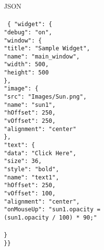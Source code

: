 \begin{minipage}{0.5\textwidth}
{\Large JSON}\\\\
\texttt{\small
\{ "widget": \{\\
\hspace*{2mm}"debug": "on",\\
\hspace*{2mm}"window": \{\\
\hspace*{4mm}"title": "Sample Widget",\\
\hspace*{4mm}"name": "main\_window",\\
\hspace*{4mm}"width": 500,\\
\hspace*{4mm}"height": 500\\
\hspace*{2mm}\},\\
\hspace*{2mm}"image": \{\\ 
\hspace*{4mm}"src": "Images/Sun.png",\\
\hspace*{4mm}"name": "sun1",\\
\hspace*{4mm}"hOffset": 250,\\
\hspace*{4mm}"vOffset": 250,\\
\hspace*{4mm}"alignment": "center"\\
\hspace*{2mm}\},\\
\hspace*{2mm}"text": \{\\
\hspace*{4mm}"data": "Click Here",\\
\hspace*{4mm}"size": 36,\\
\hspace*{4mm}"style": "bold",\\
\hspace*{4mm}"name": "text1",\\
\hspace*{4mm}"hOffset": 250,\\
\hspace*{4mm}"vOffset": 100,\\
\hspace*{4mm}"alignment": "center",\\
\hspace*{4mm}"onMouseUp": "sun1.opacity =\\
\hspace*{6mm}(sun1.opacity / 100) * 90;"\\\\
\hspace*{2mm}\}\\
\}\}
}
\end{minipage}
